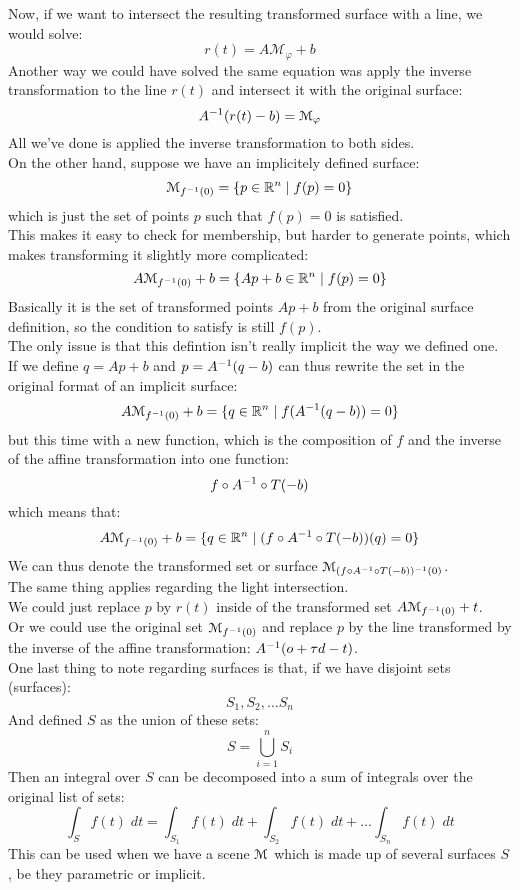 \documentclass[12pt]{article}
\begin{document}
Now, if we want to intersect the resulting
transformed surface with a line,
we would solve:
\[ r(t) = A\mathcal{M}_\varphi + b \]
Another way we could have solved the same
equation was apply the inverse transformation
to the line $r(t)$
and intersect it with the original surface:
\[ A^{-1}(r(t) - b) = \mathcal{M}_\varphi \]
All we've done is applied the inverse transformation
to both sides. \\

On the other hand, suppose we have an implicitely
defined surface:
\[ \mathcal{M}_{f^{-1}(0)}
= \{ p \in \mathbb{R}^n \mid f(p) =0 \} \]
which is just the set of points $p$
such that $f(p) = 0$ is satisfied. \\
This makes it easy to check for membership,
but harder to generate points,
which makes transforming it slightly more
complicated:
\[ A\mathcal{M}_{f^{-1}(0)} + b
= \{ Ap + b \in \mathbb{R}^n \mid f(p) =0 \} \]
Basically it is the set of transformed points 
$Ap + b$ from the original surface definition,
so the condition to satisfy is still $f(p)$. \\
The only issue is that this defintion isn't
really implicit the way we defined one. \\
If we define $q = Ap + b$
and $p = A^{-1}(q - b)$ can thus rewrite
the set in the original format of
an implicit surface:
\[ A\mathcal{M}_{f^{-1}(0)} + b
= \{ q \in \mathbb{R}^n \mid f(A^{-1}(q - b)) = 0 \} \]
but this time with a new function,
which is the composition of $f$ and the inverse of the
affine transformation into one function:
\[ f \circ A^{-1} \circ T(-b) \]
which means that:
\[ A\mathcal{M}_{f^{-1}(0)} + b
= \{ q \in \mathbb{R}^n \mid 
(f \circ A^{-1} \circ T(-b))(q) = 0 \} \]
We can thus denote the transformed set or surface
$\mathcal{M}_{(f \circ A^{-1} \circ T(-b))^{-1}(0)}$. \\

The same thing applies regarding the
light intersection. \\
We could just replace $p$
by $r(t)$
inside of the transformed set 
$A\mathcal{M}_{f^{-1}(0)} + t$. \\
Or we could use the original set
$\mathcal{M}_{f^{-1}(0)}$
and replace $p$
by the line transformed by the inverse of
the affine transformation: 
$A^{-1}(o + \tau d - t)$. \\

One last thing to note regarding surfaces
is that, if we have disjoint sets (surfaces):
\[ S_1, S_2, \dots S_n \]
And defined $S$ as the union of these sets:
\[ S = \bigcup_{i = 1}^n S_i \]
Then an integral over $S$
can be decomposed into a sum of integrals
over the original list of sets:
\[ \int_S f(t)\;dt
= \int_{S_1} f(t)\;dt + \int_{S_2} f(t)\;dt +
\dots \int_{S_n} f(t)\;dt \]
This can be used when we have a scene
$\mathcal{M}$ which is made up of several surfaces
$S$, be they parametric or implicit. \\
\end{document}

